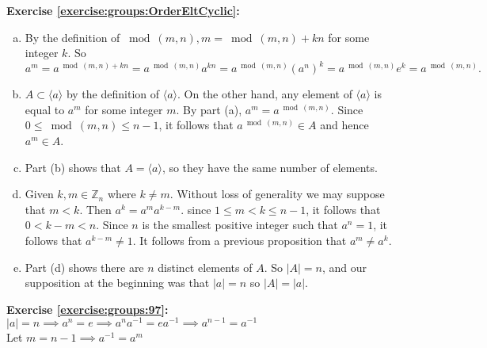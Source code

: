 \noindent\textbf{Exercise \ref{exercise:groups:OrderEltCyclic}:}
\begin{enumerate}[(a)]
\item
By the definition of $\bmod(m,n), m = \bmod(m,n) + kn$ for some integer $k$.  So
$$a^m = a^{\bmod(m,n) + kn} =  a^{\bmod(m,n)}  a^{kn} =  a^{\bmod(m,n)}  (a^n)^k
= a^{\bmod(m,n)}  e^k = a^{\bmod(m,n)}.$$

\item
$A \subset \langle a \rangle$ by the definition of $\langle a \rangle$. On the other hand, any element of $\langle a \rangle$ is equal to $a^m$ for some integer $m$.  By part (a), $a^m= a^{\bmod(m,n)}$. Since $0 \le \bmod(m,n) \le n-1$, it follows that  $a^{\bmod(m,n)} \in A$ and hence $a^m \in A$.

\item 
Part (b) shows that $A = \langle a \rangle$, so they have the same number of elements.

\item
Given $k,m \in \mathbb{Z}_n$ where $k \neq m$. Without loss of generality we may suppose that $m < k$. Then $a^k = a^ma^{k-m}$.  since $1 \le m < k \le n-1$, it follows that $0<k-m < n$.  Since $n$ is the smallest positive integer such that $a^n=1$, it follows that $a^{k-m} \neq 1$.  It follows from a previous proposition that $a^m \neq a^k$.

\item
Part (d) shows there are $n$ distinct elements of $A$. So $|A|=n$, and our supposition at the beginning was that $|a|=n$ so $|A|=|a|$.
\end{enumerate}

\noindent\textbf{Exercise \ref{exercise:groups:97}:}\\
$|a|= n \implies a^n = e \implies a^na^{-1}=ea^{-1}\implies a^{n-1}=a^{-1}$\\
Let $m=n-1 \implies a^{-1}=a^m$\\
\\

